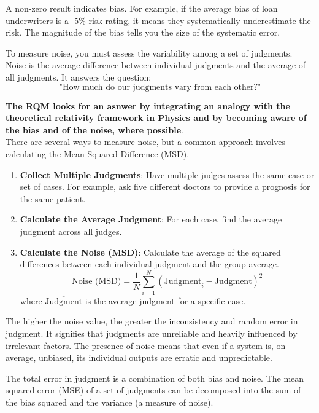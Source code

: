 \documentclass{article}
\begin{document}
 
 A non-zero result indicates bias. For example, if the average bias of loan underwriters is a -5\% risk rating, it means they systematically underestimate the risk. The magnitude of the bias tells you the size of the systematic error.
 
 
 To measure noise, you must assess the variability among a set of judgments. Noise is the average difference between individual judgments and the average of all judgments. It answers the question:
 \begin{equation}
 	\text{"How much do our judgments vary from each other?"}
 \end{equation} 
 
 \textbf{The RQM looks for an asnwer by integrating an analogy with the theoretical relativity framework in Physics and by becoming aware of the bias and of the noise, where possible}.\\
 There are several ways to measure noise, but a common approach involves calculating the Mean Squared Difference (MSD).
 
 \begin{enumerate}
 	\item \textbf{Collect Multiple Judgments}: Have multiple judges assess the same case or set of cases. For example, ask five different doctors to provide a prognosis for the same patient.
 	\item \textbf{Calculate the Average Judgment}: For each case, find the average judgment across all judges.
 	\item \textbf{Calculate the Noise (MSD)}: Calculate the average of the squared differences between each individual judgment and the group average.
 	$$ \text{Noise (MSD)} = \frac{1}{N} \sum_{i=1}^{N} (\text{Judgment}_i - \overline{\text{Judgment}})^2 $$
 	where $\overline{\text{Judgment}}$ is the average judgment for a specific case.
 \end{enumerate}

 
 The higher the noise value, the greater the inconsistency and random error in judgment. It signifies that judgments are unreliable and heavily influenced by irrelevant factors. The presence of noise means that even if a system is, on average, unbiased, its individual outputs are erratic and unpredictable.

 
 The total error in judgment is a combination of both bias and noise. The mean squared error (MSE) of a set of judgments can be decomposed into the sum of the bias squared and the variance (a measure of noise).
 
\end{document}
